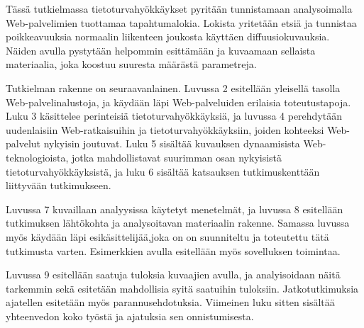 Tässä tutkielmassa tietoturvahyökkäykset pyritään tunnistamaan analysoimalla 
Web-palvelimien tuottamaa tapahtumalokia. Lokista yritetään etsiä ja tunnistaa
poikkeavuuksia normaalin liikenteen joukosta käyttäen diffuusiokuvauksia. Näiden
avulla pystytään helpommin esittämään ja kuvaamaan sellaista materiaalia, joka 
koostuu suuresta määrästä parametreja.

Tutkielman rakenne on seuraavanlainen. Luvussa 2 esitellään yleisellä
tasolla Web-palvelinalustoja, ja käydään läpi Web-palveluiden
erilaisia toteutustapoja. Luku 3 käsittelee perinteisiä
tietoturvahyökkäyksiä, ja luvussa 4 perehdytään uudenlaisiin
Web-ratkaisuihin ja tietoturvahyökkäyksiin, joiden kohteeksi
Web-palvelut nykyisin joutuvat.  Luku 5 sisältää kuvauksen
dynaamisista Web-teknologioista, jotka mahdollistavat suurimman osan
nykyisistä tietoturvahyökkäyksistä, ja luku 6 sisältää katsauksen
tutkimuskenttään liittyvään tutkimukseen.

Luvussa 7 kuvaillaan analyysissa käytetyt menetelmät, ja luvussa 8
esitellään tutkimuksen lähtökohta ja analysoitavan materiaalin rakenne.
Samassa luvussa myös käydään läpi esikäsittelijää,joka on on suunniteltu 
ja toteutettu tätä tutkimusta varten. Esimerkkien avulla esitellään myös 
sovelluksen toimintaa.

Luvussa 9 esitellään saatuja tuloksia kuvaajien avulla, ja
analyisoidaan näitä tarkemmin sekä esitetään mahdollisia syitä
saatuihin tuloksiin. Jatkotutkimuksia ajatellen esitetään
myös parannusehdotuksia. Viimeinen luku sitten sisältää
yhteenvedon koko työstä ja ajatuksia sen onnistumisesta.
